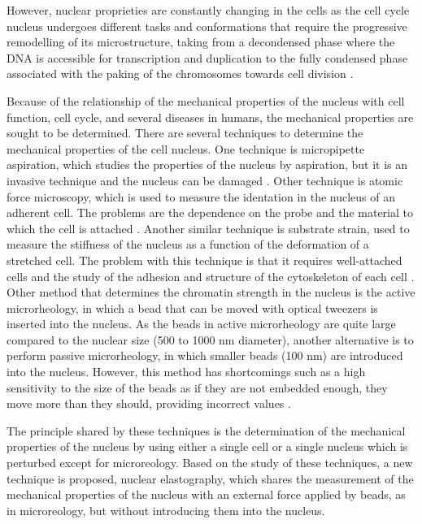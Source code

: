 \documentclass[12pt, a4paper]{article} %
\begin{document}
However, nuclear proprieties are constantly changing in the cells as the cell cycle nucleus undergoes different tasks and conformations that require the progressive remodelling of its microstructure, taking from a decondensed phase where the DNA is accessible for transcription and duplication to the fully condensed phase associated with the paking of the chromosomes towards cell division \cite{liu2017mitosis}.

\newpage

Because of the relationship of the mechanical properties of the nucleus with cell function, cell cycle, and several diseases in humans, the mechanical properties are sought to be determined. There are several techniques to determine the mechanical properties of the cell nucleus. One technique is micropipette aspiration, which studies the properties of the nucleus by aspiration, but it is an invasive technique and the nucleus can be damaged \cite{gonzalez2019advances}. Other technique is atomic force microscopy, which is used to measure the identation in the nucleus of an adherent cell. The problems are the dependence on the probe and the material to which the cell is attached \cite{janel2019stiffness}. Another similar technique is substrate strain, used to measure the stiffness of the nucleus as a function of the deformation of a stretched cell. The problem with this technique is that it requires well-attached cells and the study of the adhesion and structure of the cytoskeleton of each cell \cite{murphy2011automated}. Other method that determines the chromatin strength in the nucleus is the active microrheology, in which a bead that can be moved with optical tweezers is inserted into the nucleus. As the beads in active microrheology are quite large compared to the nuclear size (500 to 1000 nm diameter), another alternative is to perform passive microrheology, in which smaller beads (100 nm) are introduced into the nucleus. However, this method has shortcomings such as a high sensitivity to the size of the beads as if they are not embedded enough, they move more than they should, providing incorrect values \cite{lammerding2011mechanics, lammerding2007nuclear, de2007direct}.

 The principle shared by these techniques is the determination of the mechanical properties of the nucleus by using either a single cell or a single nucleus which is perturbed except for microreology. Based on the study of these techniques, a new technique is proposed, nuclear elastography, which shares the measurement of the mechanical properties of the nucleus with an external force applied by beads, as in microreology, but without introducing them into the nucleus. 
 
\end{document}
